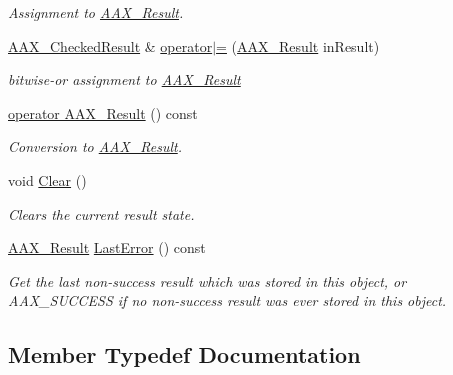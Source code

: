 \begin{DoxyCompactItemize}
\begin{DoxyCompactList}\small\item\em Assignment to \hyperlink{a00149_a4d8f69a697df7f70c3a8e9b8ee130d2f}{A\+A\+X\+\_\+\+Result}. \end{DoxyCompactList}\item 
\hyperlink{a00019}{A\+A\+X\+\_\+\+Checked\+Result} \& \hyperlink{a00019_a5be1639dbab20f74265dfad8685e7f9f}{operator$\vert$=} (\hyperlink{a00149_a4d8f69a697df7f70c3a8e9b8ee130d2f}{A\+A\+X\+\_\+\+Result} in\+Result)
\begin{DoxyCompactList}\small\item\em bitwise-\/or assignment to \hyperlink{a00149_a4d8f69a697df7f70c3a8e9b8ee130d2f}{A\+A\+X\+\_\+\+Result} \end{DoxyCompactList}\item 
\hyperlink{a00019_aa4587e68af030541fa88ed1065713328}{operator A\+A\+X\+\_\+\+Result} () const 
\begin{DoxyCompactList}\small\item\em Conversion to \hyperlink{a00149_a4d8f69a697df7f70c3a8e9b8ee130d2f}{A\+A\+X\+\_\+\+Result}. \end{DoxyCompactList}\item 
void \hyperlink{a00019_abacea9ed08e64315cb984fa630815dd7}{Clear} ()
\begin{DoxyCompactList}\small\item\em Clears the current result state. \end{DoxyCompactList}\item 
\hyperlink{a00149_a4d8f69a697df7f70c3a8e9b8ee130d2f}{A\+A\+X\+\_\+\+Result} \hyperlink{a00019_ab562025cfed2205f683deb011cbb9416}{Last\+Error} () const 
\begin{DoxyCompactList}\small\item\em Get the last non-\/success result which was stored in this object, or A\+A\+X\+\_\+\+S\+U\+C\+C\+E\+S\+S if no non-\/success result was ever stored in this object. \end{DoxyCompactList}\end{DoxyCompactItemize}


\subsection{Member Typedef Documentation}
\hypertarget{a00019_a36fd71afc6d62993c1dd96e1ca9fcc0e}{}
